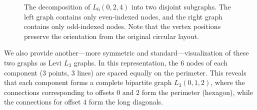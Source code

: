 \documentclass[12pt,letterpaper]{amsart}
\begin{document}
\begin{figure}[H]
    \caption{The decomposition of $L_6(0,2,4)$ into two disjoint subgraphs. The left graph contains only even-indexed nodes, and the right graph contains only odd-indexed nodes. Note that the vertex positions preserve the orientation from the original circular layout.}
    \label{fig:L6_split}
\end{figure}

We also provide another—more symmetric and standard—visualization of these two graphs as Levi $L_3$ graphs. In this representation, the 6 nodes of each component ($3$ points, $3$ lines) are spaced equally on the perimeter. This reveals that each component forms a complete bipartite graph $L_3(0,1,2)$, where the connections corresponding to offsets $0$ and $2$ form the perimeter (hexagon), while the connections for offset $4$ form the long diagonals.
\end{document}
